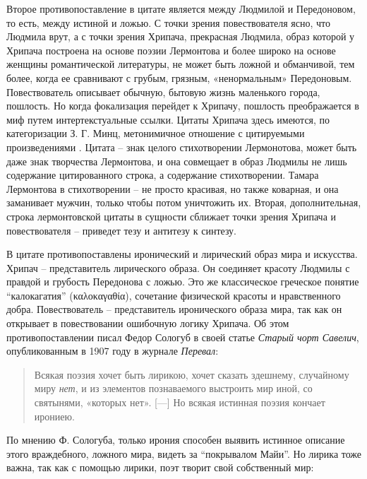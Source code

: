 \documentclass[12pt,a4paper]{article}
\begin{document}
Второе противопоставление в цитате является между Людмилой и Передоновом, то есть, между истиной и ложью. С точки зрения повествователя ясно, что Людмила врут, а с точки зрения Хрипача, прекрасная Людмила, образ которой у Хрипача построена на основе поэзии Лермонтова и более широко на основе женщины романтической литературы, не может быть ложной и обманчивой, тем более, когда ее сравнивают с грубым, грязным, «ненормальным» Передоновым. Повествователь описывает обычную, бытовую жизнь маленького города, пошлость. Но когда фокализация перейдет к Хрипачу, пошлость преображается в миф путем интертекстуальные ссылки. Цитаты Хрипача здесь имеются, по категоризации З. Г. Минц, метонимичное отношение с цитируемыми произведениями \parencite[396]{mints1973}. Цитата – знак целого стихотворении Лермонотова, может быть даже знак творчества Лермонтова, и она совмещает в образ Людмилы не лишь содержание цитированного строка, а содержание стихотворении. Тамара Лермонтова в стихотворении – не просто красивая, но также коварная, и она заманивает мужчин, только чтобы потом уничтожить их. Вторая, дополнительная, строка лермонтовской цитаты в сущности сближает точки зрения Хрипача и повествователя – приведет тезу и антитезу к синтезу.  


В цитате противопоставлены иронический и лирический образ мира и искусства. Хрипач – представитель лирического образа. Он соединяет красоту Людмилы с правдой и грубость Передонова с ложью. Это же классическое греческое понятие \enquote{калокагатия} (\foreignlanguage{greek}{καλοκαγαθία}), сочетание физической красоты и нравственного добра.  Повествователь – представитель иронического образа мира, так как он открывает в повествовании ошибочную логику Хрипача. Об этом противопоставлении писал Федор Сологуб в своей статье \textit{Старый чорт Савелич}, опубликованным в 1907 году в журнале \emph{Перевал}:  


\begin{quote}
Всякая поэзия хочет быть лирикою, хочет сказать здешнему,
случайному миру \textit{нет}, и из элементов познаваемого выстроить
мир иной, со святынями, «которых нет».
[---]
Но всякая истинная поэзия кончает ирониею.

\parencite[164.]{sologub1991}
\end{quote}

По мнению Ф. Сологуба, только ирония способен выявить истинное описание этого враждебного, ложного мира, видеть за \enquote{покрывалом Майи}. Но лирика тоже важна, так как с помощью лирики, поэт творит свой собственный мир:
\end{document}
